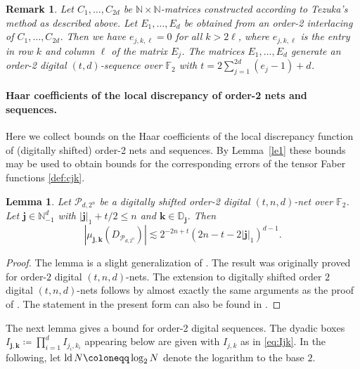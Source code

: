 \documentclass[12pt, a4paper]{article}
\newtheorem{lem}[thm]{Lemma}
\newtheorem{rem}[thm]{Remark}
\def\P{\mathcal{P}}
\def\D{\mathbb{D}}
\newcommand{\ld}{{\rm ld}\,}
\newcommand{\N}{{\mathbb{N}}} %
\newcommand{\bsj}{{\boldsymbol{j}}}
\newcommand{\bsk}{{\boldsymbol{k}}}
\begin{document}
\begin{rem}\rm
Let $C_1,\ldots,C_{2d}$ be $\mathbb{N}\times \mathbb{N}$-matrices constructed according to Tezuka's method as described above. Let $E_1,\ldots,E_d$ be obtained from an order-2 interlacing of $C_1,\ldots,C_{2 d}$. Then we have $e_{j,k,\ell}=0$ for all $k > 2 \ell$, where $e_{j,k,\ell}$ is the entry in row $k$ and column $\ell$ of the matrix $E_j$.  The matrices $E_1,\ldots,E_d$ generate an order-2 digital $(t,d)$-sequence over $\mathbb{F}_2$ with $t=2 \sum_{j=1}^{2 d} (e_j-1) + d$. 
\end{rem}

\paragraph{Haar coefficients of the local discrepancy of order-2 nets and sequences.} Here we collect bounds on the Haar coefficients of the local discrepancy function of (digitally shifted) order-2 nets and sequences. By Lemma~\ref{le1} these bounds may be used to obtain bounds for the corresponding errors of the tensor Faber functions \eqref{def:cjk}.

\begin{lem} \label{haarcoeffdignets}
Let $\P_{d,2^n}$ be a digitally shifted order-2 digital $(t,n,d)$-net over $\mathbb{F}_2$. Let $\bsj\in\N_{-1}^d$ with $|\bsj|_1+t/2\leq n$ and $\bsk\in\D_{\bsj}$. Then
\[ |\mu_{\bsj,\bsk}(D_{\P_{d,2^n}})| \lesssim 2^{-2n+t}(2n-t-2|\bsj|_1)^{d-1}. \]
\end{lem}

\begin{proof}
The lemma is a slight generalization of \cite[Lemma~5.9]{M15}. The result was originally proved for order-$2$ digital $(t,n,d)$-nets. The extension to digitally shifted order $2$ digital $(t,n,d)$-nets follows by almost exactly the same arguments as the proof of \cite[Lemma~5.9]{M15}. The statement in the present form can also be found in \cite[Lemma~3.3]{DHMP16}. 
\end{proof}

The next lemma gives a bound for order-2 digital sequences. The dyadic boxes $I_{\bsj, \bsk} \coloneqq \prod_{i=1}^d I_{j_i, k_i}$ appearing below are given with $I_{j, k}$ as in \eqref{eq:Ijk}. In the following, let $\ld N \coloneqq \log_2 N$ denote the logarithm to the base $2$.
\end{document}
